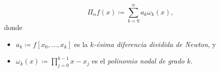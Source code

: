 \begin{frame}


	\begin{definition}
		\begin{equation*}
			\Pi_{n}
			f\left(x\right)\coloneqq
			\sum\limits_{k=0}^{n}
			a_{k}
			\omega_{k}\left(x\right),
		\end{equation*}
		donde
		\begin{itemize}
			\item

			      \begin{math}
				      a_{k}\coloneqq
				      f\left[x_{0},\ldots,x_{k}\right]
			      \end{math}
			      es la \emph{$k$-ésima diferencia dividida de Newton}, y

			\item

			      \begin{math}
				      \omega_{k}
				      \left(x\right)\coloneqq
				      \prod\limits_{j=0}^{k-1}
				      x-x_{j}
			      \end{math}
			      es el \emph{polinomio nodal de grado $k$}.
		\end{itemize}
	\end{definition}
\end{frame}

